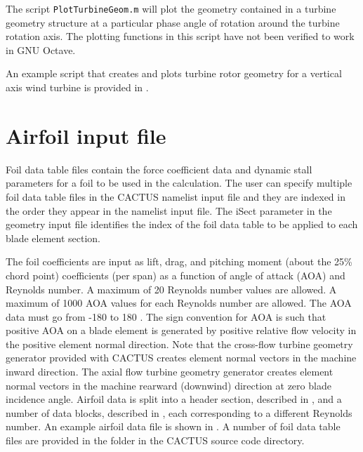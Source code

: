 The script \texttt{PlotTurbineGeom.m} will plot the geometry contained in a turbine geometry structure at a particular phase angle of rotation around the turbine rotation axis. The plotting functions in this script have not been verified to work in GNU Octave.

An example script that creates and plots turbine rotor geometry for a vertical axis wind turbine is provided in .

\section{Airfoil input file}
Foil data table files contain the force coefficient data and dynamic stall parameters for a foil to be used in the calculation. The user can specify multiple foil data table files in the CACTUS namelist input file and they are indexed in the order they appear in the namelist input file. The iSect parameter in the geometry input file identifies the index of the foil data table to be applied to each blade element section.

The foil coefficients are input as lift, drag, and pitching moment (about the 25\% chord point) coefficients (per span) as a function of angle of attack (AOA) and Reynolds number. A maximum of 20 Reynolds number values are allowed. A maximum of 1000 AOA values for each Reynolds number are allowed. The AOA data must go from -180 \si{\deg} to 180 \si{\deg}. The sign convention for AOA is such that positive AOA on a blade element is generated by positive relative flow velocity in the positive element normal direction. Note that the cross-flow turbine geometry generator provided with CACTUS creates element normal vectors in the machine inward direction. The axial flow turbine geometry generator creates element normal vectors in the machine rearward (downwind) direction at zero blade incidence angle. 
Airfoil data is split into a header section, described in , and a number of data blocks, described in , each corresponding to a different Reynolds number. An example airfoil data file is shown in . A number of foil data table files are provided in the  folder in the CACTUS source code directory.


